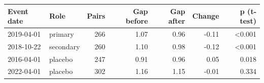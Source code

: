 \begin{tabular}{llrrrrr}
\toprule
Event date & Role & Pairs & Gap before & Gap after & Change & p (t-test) \\
\midrule
2019-04-01 & primary & 266 & 1.07 & 0.96 & -0.11 & <0.001 \\
2018-10-22 & secondary & 260 & 1.10 & 0.98 & -0.12 & <0.001 \\
2016-04-01 & placebo & 247 & 0.91 & 0.96 & 0.05 & 0.018 \\
2022-04-01 & placebo & 302 & 1.16 & 1.15 & -0.01 & 0.334 \\
\bottomrule
\end{tabular}
